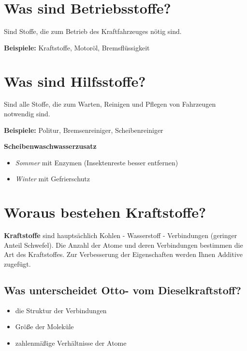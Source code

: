 \section{Was sind Betriebsstoffe?}\label{was-sind-betriebsstoffe}

Sind Stoffe, die zum Betrieb des Kraftfahrzeuges nötig sind.

\textbf{Beispiele:} Kraftstoffe, Motoröl, Bremsflüssigkeit

\section{Was sind Hilfsstoffe?}\label{was-sind-hilfsstoffe}

Sind alle Stoffe, die zum Warten, Reinigen und Pflegen von Fahrzeugen
notwendig sind.

\textbf{Beispiele:} Politur, Bremsenreiniger, Scheibenreiniger

\textbf{Scheibenwaschwasserzusatz}

\begin{itemize}
\item
  \emph{Sommer} mit Enzymen (Insektenreste besser entfernen)
\item
  \emph{Winter} mit Gefrierschutz
\end{itemize}

\section{Woraus bestehen
Kraftstoffe?}\label{woraus-bestehen-kraftstoffe}

\textbf{Kraftstoffe} sind hauptsächlich Kohlen - Wasserstoff -
Verbindungen (geringer Anteil Schwefel). Die Anzahl der Atome und deren
Verbindungen bestimmen die Art des Kraftstoffes. Zur Verbesserung der
Eigenschaften werden Ihnen Additive zugefügt.

\subsection{Was unterscheidet Otto- vom
Dieselkraftstoff?}\label{was-unterscheidet-otto--vom-dieselkraftstoff}

\begin{itemize}
\item
  die Struktur der Verbindungen
\item
  Größe der Moleküle
\item
  zahlenmäßige Verhältnisse der Atome
\end{itemize}

